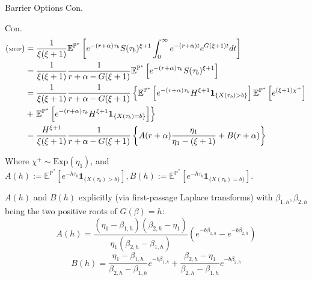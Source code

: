 \documentclass{beamer}
\begin{document}
\begin{frame}{Barrier Options Con.}

    {\footnotesize \scriptsize
    \par Con.
    \begin{align*}
         {\footnotesize \tiny(\text{MGF})}  &=\frac{1}{\xi (\xi + 1)} \mathbb{E}^{\mathbb{P}^*} \left[ e^{-(r + \alpha) \tau_b} 
            S(\tau_b)^{\xi+1} \int_0^\infty e^{-(r+\alpha)t} e^{G(\xi+1)t} dt 
           \right]\\
        & = \frac{1}{\xi(\xi+1)} \frac{1}{r + \alpha - G(\xi+1)} \mathbb{E}^{\mathbb{P}^*} \left[ e^{-(r+\alpha) \tau_b} S(\tau_b)^{\xi+1} \right]\\
        &= \frac{1}{\xi(\xi+1)} \frac{1}{r + \alpha - G(\xi+1)} \left\{\mathbb{E}^{\mathbb{P}^*} \left[ e^{-(r+\alpha) \tau_b} H^{\xi+1} \mathbf{1}_{\{X(\tau_b)>b\}} \right] 
        \mathbb{E}^{\mathbb{P}^*} \left[ e^{(\xi+1)\chi^+} \right]\right. \\
        & +\left. \mathbb{E}^{\mathbb{P}^*} \left[ e^{-(r+\alpha) \tau_b} H^{\xi+1} \mathbf{1}_{\{X(\tau_b)=b\}} \right] \right\}\\
        & = \frac{H^{\xi+1}}{\xi(\xi+1)} \frac{1}{r + \alpha - G(\xi+1)} 
        \left\{ A(r + \alpha) \frac{\eta_1}{\eta_1 - (\xi+1)} + B(r + \alpha) \right\}
    \end{align*}
    \par Where \( \chi^+ \sim \text{Exp}(\eta_1) \), and $A(h) := \mathbb{E}^{\mathbb{P}^*} [e^{-h\tau_b} \mathbf{1}_{\{X(\tau_b) > b\}}],  B(h) := \mathbb{E}^{\mathbb{P}^*} [e^{-h\tau_b} \mathbf{1}_{\{X(\tau_b) = b\}}].$
    \par \( A(h) \) and \( B(h) \) explicitly (via first-passage Laplace transforms) with \(\beta_{1,h}, \beta_{2,h}\) being the two positive roots of \( G(\beta) = h\):
        \[
        A(h) = \frac{(\eta_1 - \beta_{1,h})(\beta_{2,h} - \eta_1)}{\eta_1 (\beta_{2,h} - \beta_{1,h})} \left( e^{-b\beta_{1,h}} - e^{-b\beta_{2,h}} \right)
        \]
        \[
        B(h) = \frac{\eta_1 - \beta_{1,h}}{\beta_{2,h} - \beta_{1,h}} e^{-b\beta_{1,h}} + \frac{\beta_{2,h} - \eta_1}{\beta_{2,h} - \beta_{1,h}} e^{-b\beta_{2,h}}
        \]
    }
\end{frame}
\end{document}
